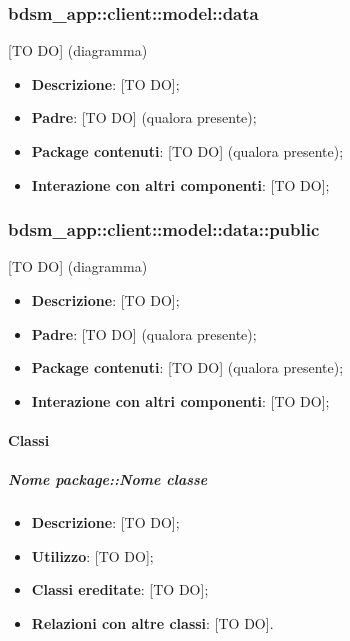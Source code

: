 
	\subsubsection{bdsm\_app::client::model::data} %
	\label{ssub:bdsm_app_client_model_data}
	[TO DO] (diagramma) \newline \newline

	\begin{itemize}
		\item \textbf{Descrizione}: [TO DO];
		\item \textbf{Padre}: [TO DO] (qualora presente);
		\item \textbf{Package contenuti}: [TO DO] (qualora presente);
		\item \textbf{Interazione con altri componenti}: [TO DO];
	\end{itemize}

	\subsubsection{bdsm\_app::client::model::data::public} %
	\label{ssub:bdsm_app_client_model_data_public}
	[TO DO] (diagramma) \newline \newline

	\begin{itemize}
		\item \textbf{Descrizione}: [TO DO];
		\item \textbf{Padre}: [TO DO] (qualora presente);
		\item \textbf{Package contenuti}: [TO DO] (qualora presente);
		\item \textbf{Interazione con altri componenti}: [TO DO];
	\end{itemize}

		\paragraph{Classi} %
			\subparagraph{Nome package::Nome classe} %
			\label{subp:subparagraph_name}
				\begin{itemize}
					\item \textbf{Descrizione}: [TO DO];
					\item \textbf{Utilizzo}: [TO DO];
					\item \textbf{Classi ereditate}: [TO DO];
					\item \textbf{Relazioni con altre classi}: [TO DO].
				\end{itemize}	

